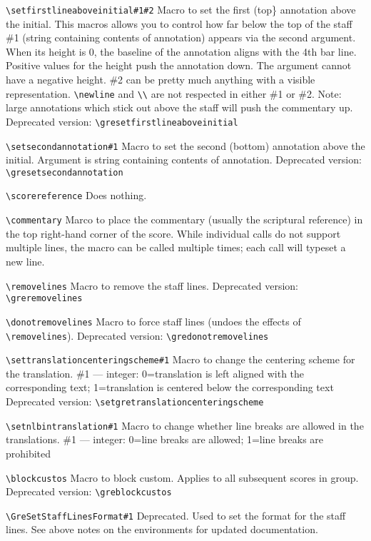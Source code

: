 \verb=\setfirstlineaboveinitial#1#2=%
	Macro to set the first (top\} annotation above the initial.  This macros allows you to control how far below the top of the staff \#1 (string containing contents of annotation) appears via the second argument.  When its height is 0, the baseline of the annotation aligns with the 4th bar line.  Positive values for the height push the annotation down.  The argument cannot have a negative height.  \#2 can be pretty much anything with a visible representation.  \verb=\newline= and \verb=\\= are not respected in either \#1 or \#2.  Note: large annotations which stick out above the staff will push the commentary up.
	Deprecated version: \verb=\gresetfirstlineaboveinitial=

\verb=\setsecondannotation#1=%
	Macro to set the second (bottom) annotation above the initial.  Argument is string containing contents of annotation.
	Deprecated version: \verb=\gresetsecondannotation=

\verb=\scorereference=%
	Does nothing.

\verb=\commentary=%
	Marco to place the commentary (usually the scriptural reference) in the top right-hand corner of the score.  While individual calls do not support multiple lines, the macro can be called multiple times; each call will typeset a new line.
	
\verb=\removelines=%
	Macro to remove the staff lines.
	Deprecated version: \verb=\greremovelines=

\verb=\donotremovelines=%
	Macro to force staff lines (undoes the effects of \verb=\removelines=).
	Deprecated version: \verb=\gredonotremovelines=

\verb=\settranslationcenteringscheme#1=%
	Macro to change the centering scheme for the translation.
	\#1 --- integer: 0=translation is left aligned with the corresponding text; 1=translation is centered below the corresponding text
	Deprecated version: \verb=\setgretranslationcenteringscheme=

\verb=\setnlbintranslation#1=%
	Macro to change whether line breaks are allowed in the translations.
	\#1 --- integer: 0=line breaks are allowed; 1=line breaks are prohibited

\verb=\blockcustos=%
	Macro to block custom.  Applies to all subsequent scores in group.
	Deprecated version: \verb=\greblockcustos=

\verb=\GreSetStaffLinesFormat#1=%
	Deprecated.  Used to set the format for the staff lines.  See above notes on the environments for updated documentation.

